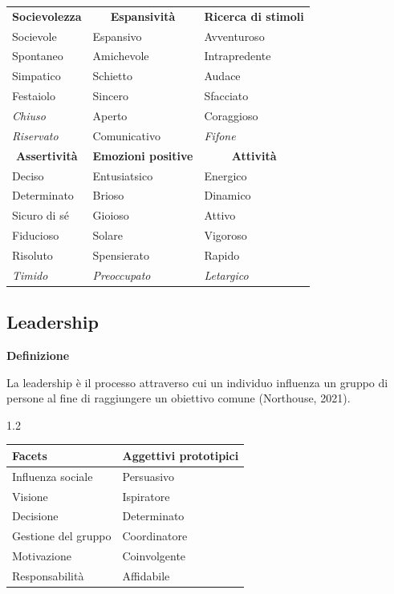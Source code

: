 \documentclass[compress]{beamer}
\newcommand\Factor{1.2}
\begin{document}
\begin{frame}
	\begin{table}
			\begin{tabular}{l l l}
			\multicolumn{1}{c}{\textbf{Socievolezza}}	&	\multicolumn{1}{c}{\textbf{Espansività}}	&	\multicolumn{1}{c}{\textbf{Ricerca di stimoli}}	\\
			Socievole	&	Espansivo	&	Avventuroso	\\
			Spontaneo	&	Amichevole	&	Intrapredente	\\
			Simpatico	&	Schietto	&	Audace	\\
			Festaiolo	&	Sincero	&	Sfacciato	\\
			\emph{Chiuso}	&	Aperto	&	Coraggioso	\\
			\emph{Riservato}	&	Comunicativo	&	\emph{Fifone}	\\
			\multicolumn{1}{c}{\textbf{Assertività}}	&	\multicolumn{1}{c}{\textbf{Emozioni positive}}	&	\multicolumn{1}{c}{\textbf{Attività}}	\\
			Deciso	&	Entusiatsico	&	Energico	\\
			Determinato	&	Brioso	&	Dinamico	\\
			Sicuro di sé	&	Gioioso	&	Attivo	\\
			Fiducioso	&	Solare	&	Vigoroso	\\
			Risoluto	&	Spensierato	&	Rapido	\\
			\emph{Timido}	&	\emph{Preoccupato}	&	\emph{Letargico}	\\
			
			
		\end{tabular}
	\end{table}

\end{frame}

\subsection*{Leadership}

\begin{frame}

\textbf{Definizione}

La leadership è il processo attraverso cui un individuo influenza un gruppo di persone al fine di raggiungere un obiettivo comune 
{\footnotesize (Northouse, 2021)}.

\begin{spacing}\Factor
\begin{table}
\begin{tabular}{l l}
\hline
Facets	&	Aggettivi prototipici	\\\hline
Influenza sociale	&	Persuasivo	\\
Visione	&	Ispiratore	\\
Decisione	&	Determinato	\\
Gestione del gruppo 	&	Coordinatore	\\
Motivazione	&	Coinvolgente	\\
Responsabilità	&	Affidabile	\\\hline
\end{tabular}
\end{table}
\end{spacing}

\end{frame}
\end{document}
